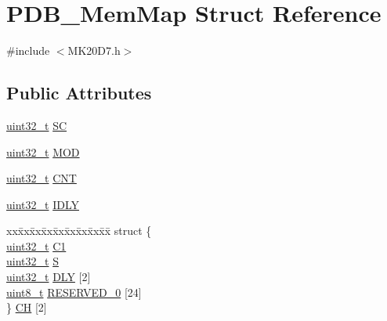 \hypertarget{struct_p_d_b___mem_map}{}\section{P\+D\+B\+\_\+\+Mem\+Map Struct Reference}
\label{struct_p_d_b___mem_map}


{\ttfamily \#include $<$M\+K20\+D7.\+h$>$}

\subsection*{Public Attributes}
\begin{DoxyCompactItemize}
\item 
\hyperlink{_p_e___types_8h_a33594304e786b158f3fb30289278f5af}{uint32\+\_\+t} \hyperlink{struct_p_d_b___mem_map_a10fb0324a394cc747b6f7d8b4c811b57}{SC}
\item 
\hyperlink{_p_e___types_8h_a33594304e786b158f3fb30289278f5af}{uint32\+\_\+t} \hyperlink{struct_p_d_b___mem_map_a01bd648b1caa9b6626636fce386b496d}{M\+OD}
\item 
\hyperlink{_p_e___types_8h_a33594304e786b158f3fb30289278f5af}{uint32\+\_\+t} \hyperlink{struct_p_d_b___mem_map_a2e90754ac53cdee38eec08416fee494e}{C\+NT}
\item 
\hyperlink{_p_e___types_8h_a33594304e786b158f3fb30289278f5af}{uint32\+\_\+t} \hyperlink{struct_p_d_b___mem_map_abbda47481fef54f3ab340fec07c8b809}{I\+D\+LY}
\item 
\begin{tabbing}
xx\=xx\=xx\=xx\=xx\=xx\=xx\=xx\=xx\=\kill
struct \{\\
\>\hyperlink{_p_e___types_8h_a33594304e786b158f3fb30289278f5af}{uint32\_t} \hyperlink{struct_p_d_b___mem_map_a7f3d427467fd70574b129f2ecd5a84ed}{C1}\\
\>\hyperlink{_p_e___types_8h_a33594304e786b158f3fb30289278f5af}{uint32\_t} \hyperlink{struct_p_d_b___mem_map_afbd33089148cbb97dedff82c1c91c46d}{S}\\
\>\hyperlink{_p_e___types_8h_a33594304e786b158f3fb30289278f5af}{uint32\_t} \hyperlink{struct_p_d_b___mem_map_a101a3b427fd438fc5dd9069f9d3f31d6}{DLY} \mbox{[}2\mbox{]}\\
\>\hyperlink{_p_e___types_8h_aba7bc1797add20fe3efdf37ced1182c5}{uint8\_t} \hyperlink{struct_p_d_b___mem_map_a26f57ce034a92374881fec262e7f9df6}{RESERVED\_0} \mbox{[}24\mbox{]}\\
\} \hyperlink{struct_p_d_b___mem_map_acb5aaedb136aae2c2a8fd73b39d7a5e6}{CH} \mbox{[}2\mbox{]}\\


\end{tabbing}
\end{DoxyCompactItemize}
